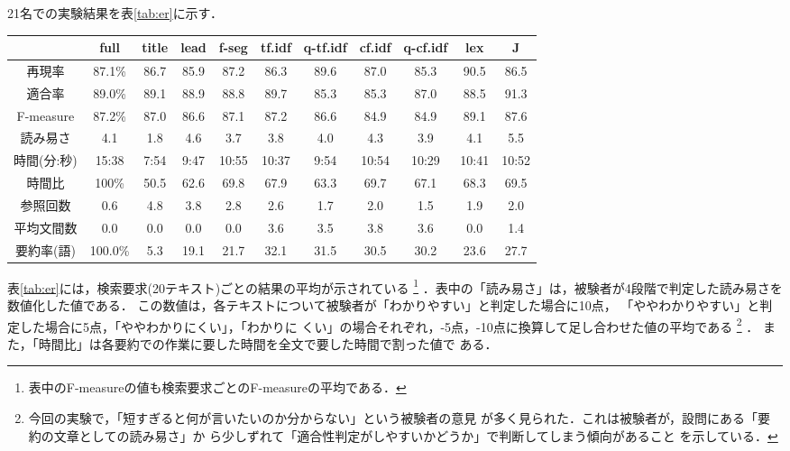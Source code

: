 21名での実験結果を表\ref{tab:er}に示す．
\begin{table*}[htbp]
\begin{center}
{\small
\begin{tabular}{|c|c|c|c|c|c|c|c|c|c|c|}\hline
	& full & title& lead &  f-seg & tf.idf
		& {\small q-tf.idf} & cf.idf & {\small q-cf.idf} & lex & J \\\hline
再現率 & 87.1\% & 86.7 & 85.9 & 87.2 & 86.3
		& 89.6 & 87.0 & 85.3 & 90.5 & 86.5\\
適合率 & 89.0\% & 89.1 & 88.9 & 88.8 & 89.7 
		& 85.3 & 85.3 & 87.0 & 88.5 & 91.3\\
{\small F-measure} 
		& 87.2\% & 87.0 & 86.6 & 87.1 & 87.2
		& 86.6 & 84.9 & 84.9 & 89.1 & 87.6\\
{\small 読み易さ} & 4.1    & 1.8  & 4.6  & 3.7  & 3.8  
		& 4.0  & 4.3  & 3.9  & 4.1  & 5.5  \\
{\small 時間(分:秒)}  & 15:38 & 7:54& 9:47&10:55&10:37
		& 9:54&10:54&10:29&10:41&10:52\\
時間比 & 100\%    & 50.5 & 62.6 & 69.8 & 67.9
		& 63.3 & 69.7 & 67.1 & 68.3 & 69.5\\%
{\small 参照回数}& 0.6    & 4.8  & 3.8  & 2.8  & 2.6
		& 1.7  & 2.0  & 1.5  & 1.9  & 2.0\\%
{\small 平均文間数}& 0.0    & 0.0  & 0.0  & 0.0  & 3.6
		& 3.5  & 3.8  & 3.6  & 0.0  & 1.4 \\%
{\small 要約率(語)}& 100.0\%& 5.3  & 19.1 & 21.7 & 32.1
		& 31.5 & 30.5 & 30.2 & 23.6 & 27.7\\\hline
\end{tabular}
}
\caption{実験結果}\label{tab:er}
\end{center}
\end{table*}

表\ref{tab:er}には，検索要求(20テキスト)ごとの結果の平均が示されている
\footnote{表中のF-measureの値も検索要求ごとのF-measureの平均である．}
．表中の「読み易さ」は，被験者が4段階で判定した読み易さを数値化した値である．
この数値は，各テキストについて被験者が「わかりやすい」と判定した場合に10点，
「ややわかりやすい」と判定した場合に5点，「ややわかりにくい」，「わかりに
くい」の場合それぞれ，-5点，-10点に換算して足し合わせた値の平均である
\footnote{
今回の実験で，「短すぎると何が言いたいのか分からない」という被験者の意見
が多く見られた．これは被験者が，設問にある「要約の文章としての読み易さ」か
ら少しずれて「適合性判定がしやすいかどうか」で判断してしまう傾向があること
を示している．}
．
また，「時間比」は各要約での作業に要した時間を全文で要した時間で割った値で
ある．

